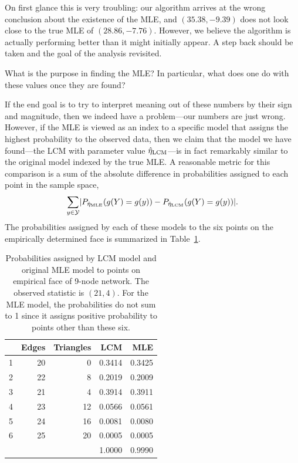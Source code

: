 On first glance this is very troubling: our algorithm arrives at the wrong conclusion 
about the existence of the MLE, and $(35.38, -9.39)$ does not look close 
to the true MLE of $(28.86, -7.76)$.  However, we believe the algorithm is
actually performing better than it might initially appear.
A step back should be taken and the goal of the analysis revisited.  

What is the purpose in finding the MLE?  In particular, what does one do with these values once they are found?

If the end goal is to try to interpret meaning out of these numbers by their sign and  
magnitude, then we indeed have a problem---our numbers are just wrong.  
However, if the MLE is viewed as an 
index to a specific model that assigns the highest probability to the observed data,
then we claim that the model we have found---the LCM with parameter value 
$\hat{\eta}_{\textrm{LCM}}$---is in fact remarkably similar to the original model indexed by the true MLE.  A 
reasonable metric for this comparison is a sum of the absolute difference in 
probabilities assigned to each point in the sample space,
\begin{align*}
	\sum_{y \in {\mathcal Y}} \lvert  P_{\hat{\eta}_{\textrm{MLE}}}(g(Y) =g(y) ) -  P_{\hat{\eta}_{\textrm{LCM}}}(g(Y) = g(y))   \rvert.
\end{align*}
The probabilities assigned by each of these models to the six points on the 
empirically determined face is summarized in Table~\ref{T:LCMvsMLE}.

\begin{table}[h!] 
\begin{center}
\caption[Comparison of probabilities assigned by LCM model and 
original MLE model to empirical face of 9-node network]
{Probabilities assigned by LCM model and original MLE model 
to points on empirical face of 9-node network.  The observed statistic is 
$(21,4)$.  For the MLE model, the probabilities do not sum to 1 since it assigns 
positive probability to points other than these six.}

\begin{tabular}{rrrrr}
\\  \hline
 & Edges & Triangles & LCM & MLE \\ 
  \hline
1 & 20 & 0 & 0.3414 & 0.3425 \\ 
  2 & 22 & 8 & 0.2019 & 0.2009 \\ 
  3 & 21 & 4 & 0.3914 & 0.3911 \\ 
  4 & 23 & 12 & 0.0566 & 0.0561 \\ 
  5 & 24 & 16 & 0.0081 & 0.0080 \\ 
  6 & 25 & 20 & 0.0005 & 0.0005 \\ 
   \hline
   &  &  & 1.0000 & 0.9990 \\ 
\end{tabular}\label{T:LCMvsMLE}
\end{center}
\end{table}

